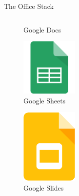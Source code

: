\documentclass[10pt]{beamer}
\begin{document}
\begin{frame}{The Office Stack}
\begin{columns}
\begin{column}{0.33\textwidth}
\begin{figure}
                    \caption{Google Docs}
                \end{figure}
                \begin{figure}
                    \centering
                    \includegraphics[width=0.25\textwidth]{images/google-sheets}
                    \caption{Google Sheets}
                \end{figure}
                \begin{figure}
                    \centering
                    \includegraphics[width=0.25\textwidth]{images/google-slides}
                    \caption{Google Slides}
                \end{figure}
            \end{column}
        \end{columns}
    \end{frame}
\end{document}
